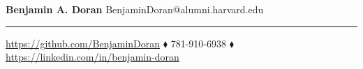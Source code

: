 \documentclass[hidelinks, 11pt]{article}
\begin{document}
\newcommand{\sectiontext}[1]{\bf\color{sectioncolor}#1}
\newcommand{\titletext}[1]{{\large\bf #1}}
\newcommand{\experiencetitle}[4]{
\titletext{#1}, {#2}  \hspace*{\fill} \emph{#3} \\ 
\emph{#4}\vspace{-6pt}
}

\begin{center}
{\huge\bf Benjamin A. Doran} \hspace*{\fill}  
{\color{blue}BenjaminDoran@alumni.harvard.edu} 
\hrule
\vspace{6pt}
{\color{blue}\url{https://github.com/BenjaminDoran}} $\blacklozenge$ 781-910-6938 $\blacklozenge$ {\color{blue}\url{https://linkedin.com/in/benjamin-doran}}
\end{center}
\vspace{-6pt}


\end{document}
